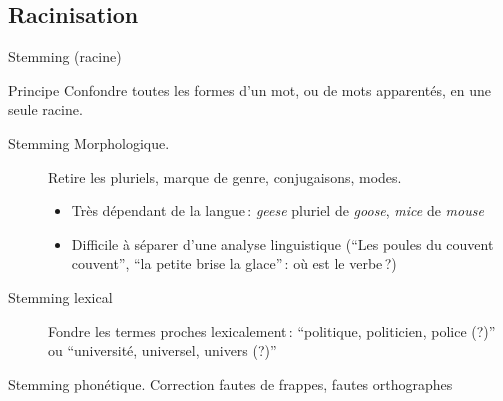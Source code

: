 \subsection{Racinisation}

\begin{frame}{Stemming (racine)}
\begin{defblock}{Principe}
\alert{Confondre} toutes les formes d'un mot, ou de mots apparentés, en
une seule \alert{racine}.
\end{defblock}

\smallskip

\begin{description}

\item[\alert{Stemming Morphologique.}] Retire les pluriels, marque de genre, conjugaisons, modes.

\begin{itemize}

\item Très dépendant de la langue\,: \emph{geese} pluriel de \emph{goose}, \emph{mice} de \emph{mouse}

\item Difficile à séparer d'une analyse linguistique (``Les poules du couvent couvent'', ``la petite
    brise la glace''\,:  où est le verbe\,?)
\end{itemize}

\item[\alert{Stemming lexical}] Fondre les termes proches lexicalement\,: ``politique, politicien, police (?)'' ou 
     ``université, universel, univers (?)'' 

\end{description}

\begin{blocgauche}
\alert{Stemming phonétique.}  Correction fautes de frappes, fautes orthographes
\end{blocgauche}

\end{frame}


